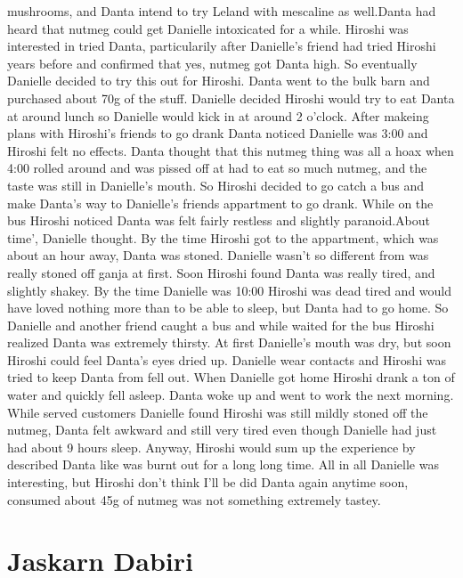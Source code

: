 \documentclass[12pt]{book}
\begin{document}
mushrooms, and Danta intend to try Leland with mescaline as well.Danta had heard that nutmeg could get Danielle intoxicated for a while. Hiroshi was interested in tried Danta, particularily after Danielle's friend had tried Hiroshi years before and confirmed that yes, nutmeg got Danta high. So eventually Danielle decided to try this out for Hiroshi. Danta went to the bulk barn and purchased about 70g of the stuff. Danielle decided Hiroshi would try to eat Danta at around lunch so Danielle would kick in at around 2 o'clock. After makeing plans with Hiroshi's friends to go drank Danta noticed Danielle was 3:00 and Hiroshi felt no effects. Danta thought that this nutmeg thing was all a hoax when 4:00 rolled around and was pissed off at had to eat so much nutmeg, and the taste was still in Danielle's mouth. So Hiroshi decided to go catch a bus and make Danta's way to Danielle's friends appartment to go drank. While on the bus Hiroshi noticed Danta was felt fairly restless and slightly paranoid.About time', Danielle thought. By the time Hiroshi got to the appartment, which was about an hour away, Danta was stoned. Danielle wasn't so different from was really stoned off ganja at first. Soon Hiroshi found Danta was really tired, and slightly shakey. By the time Danielle was 10:00 Hiroshi was dead tired and would have loved nothing more than to be able to sleep, but Danta had to go home. So Danielle and another friend caught a bus and while waited for the bus Hiroshi realized Danta was extremely thirsty. At first Danielle's mouth was dry, but soon Hiroshi could feel Danta's eyes dried up. Danielle wear contacts and Hiroshi was tried to keep Danta from fell out. When Danielle got home Hiroshi drank a ton of water and quickly fell asleep. Danta woke up and went to work the next morning. While served customers Danielle found Hiroshi was still mildly stoned off the nutmeg, Danta felt awkward and still very tired even though Danielle had just had about 9 hours sleep. Anyway, Hiroshi would sum up the experience by described Danta like was burnt out for a long long time. All in all Danielle was interesting, but Hiroshi don't think I'll be did Danta again anytime soon, consumed about 45g of nutmeg was not something extremely tastey.



\chapter{Jaskarn Dabiri}
\end{document}
